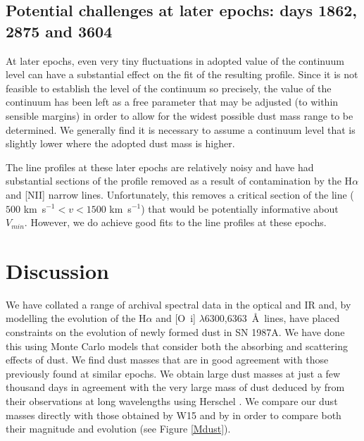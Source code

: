 \subsection{Potential challenges at later epochs: days 1862, 2875 and 3604}

At later epochs, even very tiny fluctuations in adopted value of the 
continuum level can have a substantial effect on the fit of the resulting 
profile.  Since it is not feasible to establish the level of the continuum 
so precisely, the value of the continuum has been left as a free parameter 
that may be adjusted (to within sensible margins) in order to allow for 
the widest possible dust mass range to be determined.  We generally find 
it is necessary to assume a continuum level that is slightly lower where 
the adopted dust mass is higher.

The line profiles at these later epochs are relatively noisy and have had 
substantial sections of the profile removed as a result of contamination 
by the H$\alpha$ and [NII] narrow lines.  Unfortunately, this removes a 
critical section of the line ($500$ km~s$^{-1}<v<1500$ km~s$^{-1}$) that 
would be potentially informative about $V_{min}$.  However, we do achieve good fits 
to the line profiles at these epochs.



\section{Discussion}
\label{discuss}

We have collated a range of archival spectral data in the optical and IR 
and, by modelling the evolution of the H$\alpha$ and 
[O~{\sc i}] $\lambda$6300,6363~\AA\ lines, have placed constraints on the 
evolution of newly formed dust in SN 1987A. We have done this using Monte Carlo 
models that consider both the absorbing and scattering effects of dust.  
We find dust masses that are in good agreement with those previously 
found at similar epochs.  We obtain large dust masses at just a few 
thousand days in agreement with the very large mass of dust deduced by from their observations at long wavelengths 
using Herschel \citep{Matsuura2011}. We compare our dust masses directly with those obtained by 
W15 and by \citet{Lucy1989b} in order to compare both their magnitude and evolution (see Figure 
\ref{Mdust}).

